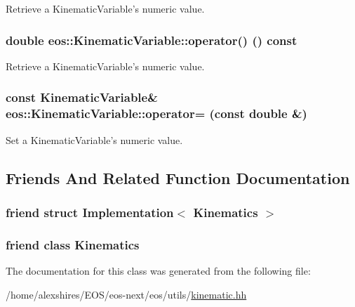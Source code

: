 Retrieve a KinematicVariable's numeric value. \hypertarget{classeos_1_1KinematicVariable_a0281059d13f1e6bd8e9e36b89f96f60f}{
\subsubsection[{operator()}]{\setlength{\rightskip}{0pt plus 5cm}double eos::KinematicVariable::operator() () const}}
\label{classeos_1_1KinematicVariable_a0281059d13f1e6bd8e9e36b89f96f60f}


Retrieve a KinematicVariable's numeric value. \hypertarget{classeos_1_1KinematicVariable_ac6f65d2b8959b6f3b66d31be915caba9}{
\subsubsection[{operator=}]{\setlength{\rightskip}{0pt plus 5cm}const {\bf KinematicVariable}\& eos::KinematicVariable::operator= (const double \&)}}
\label{classeos_1_1KinematicVariable_ac6f65d2b8959b6f3b66d31be915caba9}


Set a KinematicVariable's numeric value. 

\subsection{Friends And Related Function Documentation}
\hypertarget{classeos_1_1KinematicVariable_a06e93a5d7c76d2cfb672a43a7dbd421b}{
\subsubsection[{Implementation$<$ Kinematics $>$}]{\setlength{\rightskip}{0pt plus 5cm}friend struct Implementation$<$ {\bf Kinematics} $>$}}
\label{classeos_1_1KinematicVariable_a06e93a5d7c76d2cfb672a43a7dbd421b}
\hypertarget{classeos_1_1KinematicVariable_a8fb81632f9425f6152aade7346401b4c}{
\subsubsection[{Kinematics}]{\setlength{\rightskip}{0pt plus 5cm}friend class {\bf Kinematics}}}
\label{classeos_1_1KinematicVariable_a8fb81632f9425f6152aade7346401b4c}


The documentation for this class was generated from the following file:\begin{DoxyCompactItemize}
\item 
/home/alexshires/EOS/eos-\/next/eos/utils/\hyperlink{kinematic_8hh}{kinematic.hh}\end{DoxyCompactItemize}
